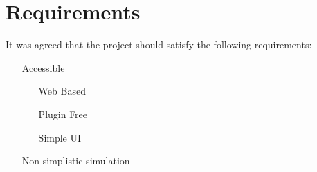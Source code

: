 \chapter{Requirements}
It was agreed that the project should satisfy the following requirements:

\begin{itemize}
	\item[Accessible]
	\begin{itemize}
		\item[Web Based]
		\item[Plugin Free]
		\item[Simple UI]
	\end{itemize}
	
	\item[Non-simplistic simulation]
\end{itemize}

